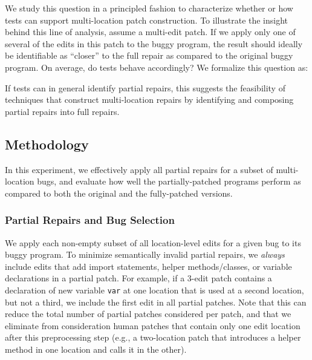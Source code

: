 \documentclass[10pt, conference]{IEEEtran}
\begin{document}
We study this question in a principled fashion to characterize whether or how
tests can support multi-location patch construction. To illustrate the insight
behind this line of analysis, assume a multi-edit patch. If we apply only one of
several of the edits in this patch to the buggy program, the result should
ideally be identifiable as ``closer'' to the full repair as compared to the
original buggy program. On average, do tests behave accordingly? We formalize
this question as:


If tests can in general identify partial repairs, this suggests the feasibility
of techniques that construct multi-location repairs by identifying and composing
partial repairs into full repairs.  



\subsection{Methodology}
\label{sec:partial-repair-methodology}

In this experiment, we effectively apply all partial repairs for
a subset of multi-location bugs, and
evaluate how well the partially-patched programs perform 
as compared to both the original and the fully-patched versions. 

\subsubsection{Partial Repairs and Bug Selection}
We apply each non-empty subset of all location-level edits for a given bug to
its buggy program.  To minimize semantically invalid partial repairs, we \emph{always}
include edits that add import statements, helper methods/classes, or variable declarations
in a partial patch. 
For example, if a 3-edit patch contains a declaration of new variable
\texttt{var} at one location that is used at a second location, but not a third,
we include the first edit in all partial patches.  Note that this can reduce the total
number of partial patches considered per patch, and that we eliminate from
consideration human patches that contain only 
one edit location after this preprocessing step (e.g., a two-location patch that introduces a
helper method in one location and calls it in the other).  
\end{document}
